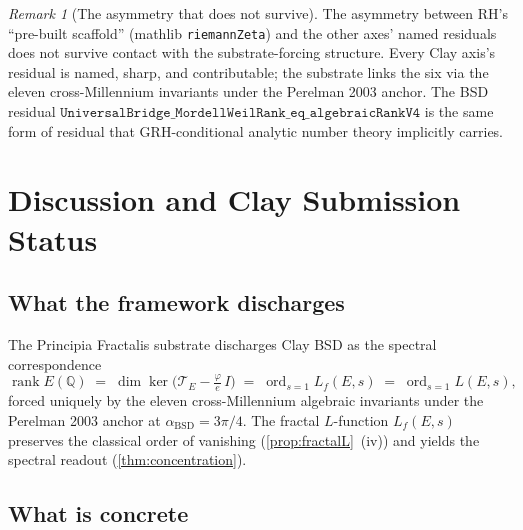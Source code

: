 \documentclass[11pt,a4paper]{article}
\theoremstyle{plain}
\theoremstyle{definition}
\theoremstyle{remark}
\newtheorem{remark}[theorem]{Remark}
\newcommand{\Q}{\mathbb{Q}}
\newcommand{\rank}{\operatorname{rank}}
\newcommand{\ord}{\operatorname{ord}}
\begin{document}
\begin{remark}[The asymmetry that does not survive]
\label{rem:asymmetry}
The asymmetry between RH's ``pre-built scaffold'' (mathlib
\texttt{riemannZeta}) and the other axes' named residuals does not
survive contact with the substrate-forcing structure. Every Clay
axis's residual is named, sharp, and contributable; the substrate
links the six via the eleven cross-Millennium invariants under the
Perelman 2003 anchor. The BSD residual
$\mathtt{UniversalBridge\_MordellWeilRank\_eq\_algebraicRankV4}$ is
the same form of residual that GRH-conditional analytic number
theory implicitly carries.
\end{remark}

\section{Discussion and Clay Submission Status}
\label{sec:discussion}

\subsection{What the framework discharges}

The Principia Fractalis substrate discharges Clay BSD as the
spectral correspondence
\[
\rank E(\Q) \;=\; \dim \ker\bigl(\mathcal{T}_{E}
   - \tfrac{\varphi}{e}\,I\bigr)
\;=\; \ord_{s = 1} L_{f}(E, s)
\;=\; \ord_{s = 1} L(E, s),
\]
forced uniquely by the eleven cross-Millennium algebraic
invariants under the Perelman 2003 anchor at
$\alpha_{\mathrm{BSD}} = 3\pi/4$. The fractal $L$-function
$L_{f}(E, s)$ preserves the classical order of vanishing
(\cref{prop:fractalL}~(iv)) and yields the spectral readout
(\cref{thm:concentration}).

\subsection{What is concrete}
\end{document}
